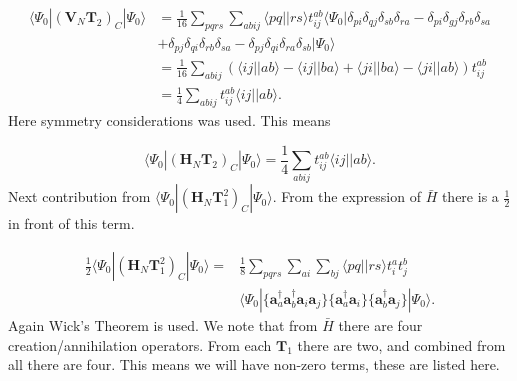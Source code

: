 \begin{align}
\langle \Psi_0 | (\textbf{V}_N \textbf{T}_2)_C | \Psi_0 \rangle & =  \frac{1}{16} \sum_{pqrs} \sum_{abij}  \langle pq||rs \rangle t_{ij}^{ab} \langle \Psi_0|
\delta_{pi} \delta_{qj} \delta_{sb} \delta_{ra} 
- \delta_{pi} \delta_{gj} \delta_{rb} \delta_{sa}\nonumber \\ & 
+ \delta_{pj} \delta_{qi} \delta_{rb} \delta_{sa}
- \delta_{pj} \delta_{qi} \delta_{ra} \delta_{sb}
| \Psi_0 \rangle \nonumber \\ &
= \frac{1}{16} \sum_{abij} ( 
\langle ij || ab \rangle
- \langle ij || ba \rangle
+ \langle ji || ba \rangle
- \langle ji || ab \rangle ) t_{ij}^{ab} \nonumber \\ &
= \frac{1}{4} \sum_{abij} t_{ij}^{ab} \langle ij||ab \rangle .
\end{align}
Here symmetry considerations was used. This means 

\begin{equation}
\langle \Psi_0 | (\textbf{H}_N \textbf{T}_2)_C | \Psi_0 \rangle = \frac{1}{4} \sum_{abij} t_{ij}^{ab} \langle ij||ab \rangle . \label{Energy_Contribution_2}
\end{equation}
Next contribution from $\langle \Psi_0 | (\textbf{H}_N \textbf{T}_1^2)_C | \Psi_0 \rangle$. From the expression of $\bar{H}$ there is a $\frac{1}{2}$ in front of this term.

\begin{align}
\frac{1}{2} \langle \Psi_0 | (\textbf{H}_N \textbf{T}_1^2)_C | \Psi_0 \rangle = & \frac{1}{8} \sum_{pqrs} \sum_{ai} \sum_{bj} \langle pq || rs \rangle t_i^a t_j^b \nonumber \\ & 
\langle \Psi_0| 
 \{\textbf{a}^{\dag}_a \textbf{a}^{\dag}_b \textbf{a}_i \textbf{a}_j \}
\{\textbf{a}^{\dag}_a \textbf{a}_i \}
\{\textbf{a}^{\dag}_b \textbf{a}_j \}
| \Psi_0 \rangle .
\end{align}
Again Wick's Theorem is used. We note that from $\bar{H}$ there are four creation/annihilation operators. From each $\textbf{T}_1$ there are two, and combined from all there are four. This means we will have non-zero terms, these are listed here.

